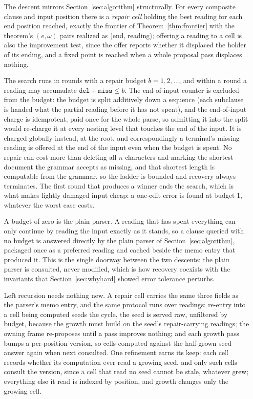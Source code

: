 \documentclass[manuscript]{acmart}
\newcommand{\cd}[1]{\texttt{#1}}
\begin{document}
The descent mirrors Section~\ref{sec:algorithm} structurally. For every composite clause and input position there is a \emph{repair cell} holding the best reading for each end position reached, exactly the frontier of Theorem~\ref{thm:frontier} with the theorem's $(e, \omega)$ pairs realized as (end, reading); offering a reading to a cell is also the improvement test, since the offer reports whether it displaced the holder of its ending, and a fixed point is reached when a whole proposal pass displaces nothing.

The search runs in rounds with a repair budget $b = 1, 2, \ldots$, and within a round a reading may accumulate $\cd{del} + \cd{miss} \le b$. The end-of-input counter is excluded from the budget: the budget is split additively down a sequence (each subclause is handed what the partial reading before it has not spent), and the end-of-input charge is idempotent, paid once for the whole parse, so admitting it into the split would re-charge it at every nesting level that touches the end of the input. It is charged globally instead, at the root, and correspondingly a terminal's missing reading is offered at the end of the input even when the budget is spent. No repair can cost more than deleting all $n$ characters and marking the shortest document the grammar accepts as missing, and that shortest length is computable from the grammar, so the ladder is bounded and recovery always terminates. The first round that produces a winner ends the search, which is what makes lightly damaged input cheap: a one-edit error is found at budget 1, whatever the worst case costs.

A budget of zero is the plain parser. A reading that has spent everything can only continue by reading the input exactly as it stands, so a clause queried with no budget is answered directly by the plain parser of Section~\ref{sec:algorithm}, packaged once as a preferred reading and cached beside the memo entry that produced it. This is the single doorway between the two descents: the plain parser is consulted, never modified, which is how recovery coexists with the invariants that Section~\ref{sec:whyhard} showed error tolerance perturbs.

Left recursion needs nothing new. A repair cell carries the same three fields as the parser's memo entry, and the same protocol runs over readings: re-entry into a cell being computed seeds the cycle, the seed is served raw, unfiltered by budget, because the growth must build on the seed's repair-carrying readings; the owning frame re-proposes until a pass improves nothing; and each growth pass bumps a per-position version, so cells computed against the half-grown seed answer again when next consulted. One refinement earns its keep: each cell records whether its computation ever read a growing seed, and only such cells consult the version, since a cell that read no seed cannot be stale, whatever grew; everything else it read is indexed by position, and growth changes only the growing cell.
\end{document}

